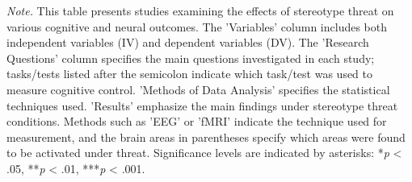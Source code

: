 \documentclass[
  stu, a4paper,floatsintext]{apa7}
\newenvironment{lltable}{\begin{landscape}\centering\begin{ThreePartTable}}{\end{ThreePartTable}\end{landscape}}
\begin{document}
\begin{lltable}

\begin{TableNotes}[para]
\normalsize{\textit{Note.} This table presents studies examining the effects of stereotype threat on various cognitive and neural outcomes. The 'Variables' column includes both independent variables (IV) and dependent variables (DV). The 'Research Questions' column specifies the main questions investigated in each study; tasks/tests listed after the semicolon indicate which task/test was used to measure cognitive control. 'Methods of Data Analysis' specifies the statistical techniques used. 'Results' emphasize the main findings under stereotype threat conditions. Methods such as 'EEG' or 'fMRI' indicate the technique used for measurement, and the brain areas in parentheses specify which areas were found to be activated under threat. Significance levels are indicated by asterisks: *\textit{p} < .05, **\textit{p} < .01, ***\textit{p} < .001.}
\end{TableNotes}

\small{

}
\end{lltable}
\end{document}
